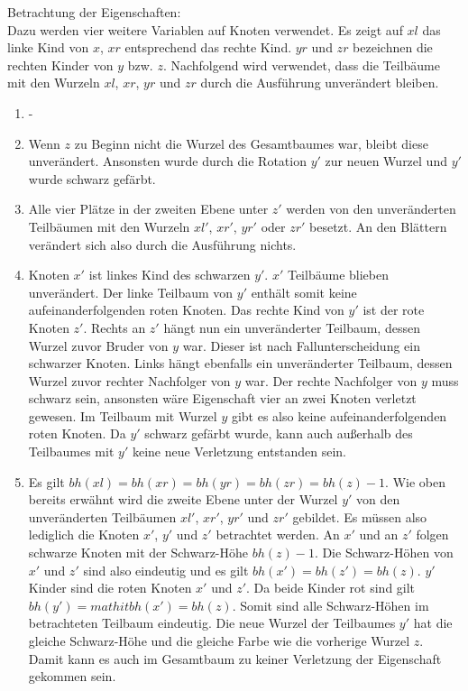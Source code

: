 \documentclass[a4paper,12pt]{article}
\begin{document}
\noindent Betrachtung der Eigenschaften:\\
\noindent Dazu werden vier weitere Variablen auf Knoten verwendet. Es zeigt auf $\mathit{xl}$ das linke Kind von $x$,  $\mathit{xr}$ entsprechend das rechte Kind. $\mathit{yr}$ und $zr$ bezeichnen die rechten Kinder von $y$ bzw. $z$. Nachfolgend wird verwendet, dass die Teilbäume mit den Wurzeln $xl$, $xr$, $yr$ und $zr$ durch die Ausführung unverändert bleiben.
\begin{enumerate}
	\item -
	\item Wenn $z$ zu Beginn nicht die Wurzel des Gesamtbaumes war, bleibt diese unverändert. Ansonsten wurde durch die Rotation $y'$ zur neuen Wurzel und $y'$ wurde schwarz gefärbt. 
	\item  Alle vier Plätze in der zweiten Ebene unter $z'$ werden von den unveränderten Teilbäumen mit den Wurzeln $xl'$, $xr'$, $yr'$ oder $zr'$ besetzt. An den Blättern verändert sich also durch die Ausführung nichts.
	\item  Knoten $x'$ ist linkes Kind des schwarzen $y'$. $x'$ Teilbäume blieben unverändert. Der linke Teilbaum von $y'$ enthält somit keine aufeinanderfolgenden roten Knoten. Das rechte Kind von $y'$ ist der rote Knoten $z'$. Rechts an $z'$ hängt nun ein unveränderter Teilbaum, dessen Wurzel zuvor Bruder von $y$ war. Dieser ist nach Fallunterscheidung ein schwarzer Knoten. Links hängt ebenfalls ein unveränderter Teilbaum, dessen Wurzel zuvor rechter Nachfolger von $y$ war. Der rechte Nachfolger von $y$ muss schwarz sein, ansonsten wäre Eigenschaft vier an zwei Knoten verletzt gewesen. Im Teilbaum mit Wurzel $y$ gibt es also keine aufeinanderfolgenden roten Knoten. Da $y'$ schwarz gefärbt wurde, kann auch außerhalb des Teilbaumes mit $y'$ keine neue Verletzung entstanden sein.
	\item  Es gilt  $\mathit{bh(xl)} = \mathit{bh(xr)} = \mathit{bh(yr)} =  \mathit{bh(zr)} = \mathit{bh(z)} - 1$. Wie oben bereits erwähnt wird die zweite Ebene unter der Wurzel $y'$ von den unveränderten Teilbäumen $\mathit{xl'}$, $\mathit{xr'}$, $\mathit{yr'}$ und $\mathit{zr'}$ gebildet. Es müssen also lediglich die Knoten $x'$, $y'$ und $z'$ betrachtet werden. An $x'$ und an $z'$ folgen schwarze Knoten mit der Schwarz-Höhe $\mathit{bh(z)} - 1$. Die Schwarz-Höhen von $x'$ und $z'$ sind also eindeutig und es gilt $\mathit{bh(x')} = \mathit{bh(z')} = \mathit{bh(z)}$. $y'$ Kinder sind die roten Knoten $x'$ und $z'$. Da beide Kinder rot sind gilt $\mathit{bh(y')} = mathit{bh(x')} = \mathit{bh(z)}$. Somit sind alle Schwarz-Höhen im betrachteten Teilbaum eindeutig. Die neue Wurzel der Teilbaumes $y'$ hat die gleiche Schwarz-Höhe und die gleiche Farbe wie die vorherige Wurzel $z$. Damit kann es auch im Gesamtbaum zu keiner Verletzung der Eigenschaft gekommen sein.
\end{enumerate} 
\end{document}

